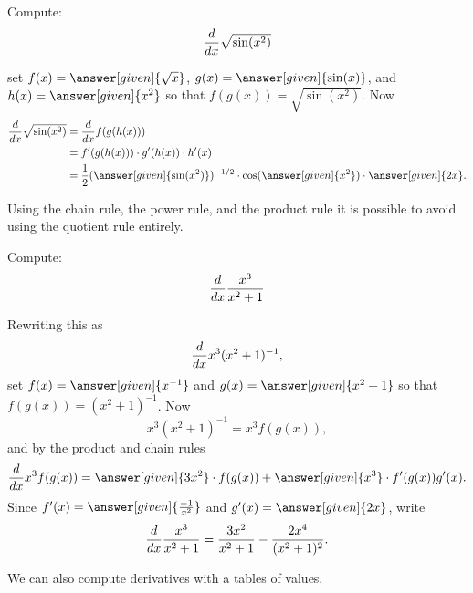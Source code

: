 \documentclass{ximera}
\begin{document}
\begin{example}
Compute:
\[
\frac{d}{\mathop{}\!d x} \sqrt{\sin(x^2)}
\]

\begin{explanation}
set $f(x) = \answer[given]{\sqrt{x}}$, $g(x) = \answer[given]{\sin(x)}$, and $h(x) = \answer[given]{x^2}$
so that $f(g(x)) = \sqrt{\sin(x^2)}$. Now
\begin{align*}
  \ddx \sqrt{\sin(x^2)} &= \ddx f(g(h(x)))\\
  &= f'(g(h(x))) \cdot g'(h(x)) \cdot h'(x)\\
  &= \frac{1}{2}(\answer[given]{\sin(x^2)})^{-1/2} \cdot \cos(\answer[given]{x^2}) \cdot \answer[given]{2x}.
\end{align*}
\end{explanation}
\end{example}




Using the chain rule, the power rule, and the product rule it is
possible to avoid using the quotient rule entirely.

\begin{example}
Compute:
\[
\frac{d}{\mathop{}\!d x} \frac{x^3}{x^2+1}
\]

\begin{explanation}
Rewriting this as 
\[
\frac{d}{\mathop{}\!d x} x^3(x^2+1)^{-1}, 
\]
set $f(x) = \answer[given]{x^{-1}}$ and $g(x) = \answer[given]{x^2+1}$ so that $f(g(x)) = (x^2 + 1)^{-1}$. Now
\[
x^3(x^2+1)^{-1} = x^3 f(g(x)),
\]
and by the product and chain rules
\[
\ddx x^3 f(g(x)) = \answer[given]{3x^2} \cdot f(g(x))+ \answer[given]{x^3} \cdot f'(g(x))g'(x).
\]
Since $f'(x) = \answer[given]{\frac{-1}{x^2}}$ and $g'(x) = \answer[given]{2x}$, write
\[
\frac{d}{\mathop{}\!d x} \frac{x^3}{x^2+1} = \frac{3x^2}{x^2+1}-\frac{2x^4}{(x^2+1)^2}.
\]
\end{explanation}
\end{example}


We can also compute derivatives with a tables of values.
\end{document}
